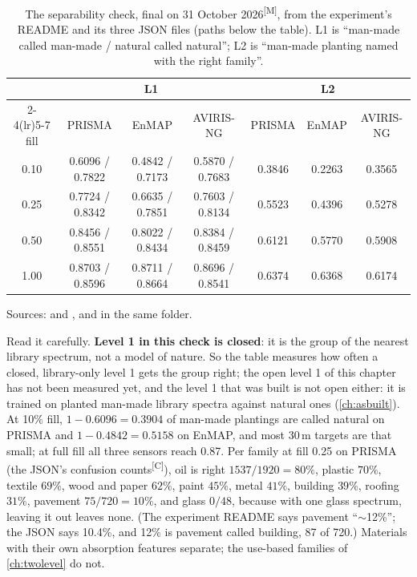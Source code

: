 \documentclass[11pt,a4paper,oneside,openany]{book}
\newcommand{\meas}{\textsuperscript{\textsf{\scriptsize[M]}}}
\newcommand{\comp}{\textsuperscript{\textsf{\scriptsize[C]}}}
\begin{document}
\begin{table}[htbp]
\centering\small
\caption{The separability check, final on 31 October 2026\meas, from the experiment's README and its three JSON files (paths below
the table). L1 is ``man-made called man-made / natural called natural''; L2 is ``man-made planting named with the right family''.}
\label{tab:separability}
\begin{tabular}{@{}ccccccc@{}}
\toprule
 & \multicolumn{3}{c}{L1} & \multicolumn{3}{c}{L2}\\
\cmidrule(lr){2-4}\cmidrule(lr){5-7}
fill & PRISMA & EnMAP & AVIRIS-NG & PRISMA & EnMAP & AVIRIS-NG\\
\midrule
0.10 & 0.6096 / 0.7822 & 0.4842 / 0.7173 & 0.5870 / 0.7683 & 0.3846 & 0.2263 & 0.3565\\
0.25 & 0.7724 / 0.8342 & 0.6635 / 0.7851 & 0.7603 / 0.8134 & 0.5523 & 0.4396 & 0.5278\\
0.50 & 0.8456 / 0.8551 & 0.8022 / 0.8434 & 0.8384 / 0.8459 & 0.6121 & 0.5770 & 0.5908\\
1.00 & 0.8703 / 0.8596 & 0.8711 / 0.8664 & 0.8696 / 0.8541 & 0.6374 & 0.6368 & 0.6174\\
\bottomrule
\end{tabular}
\end{table}

Sources:  and ,  and
 in the same folder.

Read it carefully. \textbf{Level 1 in this check is closed}: it is the group of the nearest library spectrum, not a model of nature. So the table measures how often a
closed, library-only level 1 gets the group right; the open level 1 of this chapter has not been measured yet, and the level 1 that was built is not open either: it is
trained on planted man-made library spectra against natural ones (\cref{ch:asbuilt}). At 10\% fill, $1-0.6096=0.3904$ of man-made plantings are
called natural on PRISMA and $1-0.4842=0.5158$ on EnMAP, and most 30\,m targets are that small; at full fill all three sensors reach 0.87. Per family at fill 0.25 on PRISMA
(the JSON's confusion counts\comp), oil is right $1537/1920=80\%$, plastic $70\%$, textile $69\%$, wood and paper $62\%$, paint $45\%$, metal $41\%$, building $39\%$, roofing
$31\%$, pavement $75/720=10\%$, and glass $0/48$, because with one glass spectrum, leaving it out leaves none. (The experiment README says pavement ``$\sim$12\%''; the JSON
says 10.4\%, and 12\% is pavement called building, 87 of 720.) Materials with their own absorption features separate; the use-based families of \cref{ch:twolevel} do not.
\end{document}
